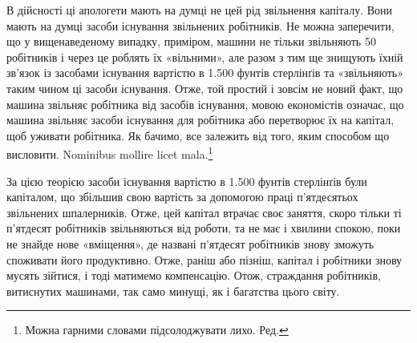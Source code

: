 В дійсності ці апологети мають на думці не цей рід звільнення
капіталу. Вони мають на думці засоби існування звільнених робітників.
Не можна заперечити, що у вищенаведеному випадку,
приміром, машини не тільки звільняють 50 робітників і через це
роблять їх «вільними», але разом з тим ще знищують їхній зв’язок
із засобами існування вартістю в 1.500 фунтів стерлінґів та
«звільняють» таким чином ці засоби існування. Отже, той простий
і зовсім не новий факт, що машина звільняє робітника від
засобів існування, мовою економістів означає, що машина звільняє
засоби існування для робітника або перетворює їх на капітал,
щоб уживати робітника. Як бачимо, все залежить від того, яким
способом що висловити. Nominibus mollire licet mala.\footnote*{
Можна гарними словами підсолоджувати лихо. Ред.
}

За цією теорією засоби існування вартістю в 1.500 фунтів
стерлінґів були капіталом, що збільшив свою вартість за допомогою
праці п’ятдесятьох звільнених шпалерників. Отже, цей
капітал втрачає своє заняття, скоро тільки ті п’ятдесят робітників
звільняються від роботи, та не має і хвилини спокою, поки
не знайде нове «вміщення», де названі п’ятдесят робітників
знову зможуть споживати його продуктивно. Отже, раніш або
пізніш, капітал і робітники знову мусять зійтися, і тоді матимемо
компенсацію. Отож, страждання робітників, витиснутих машинами,
так само минущі, як і багатства цього світу.

